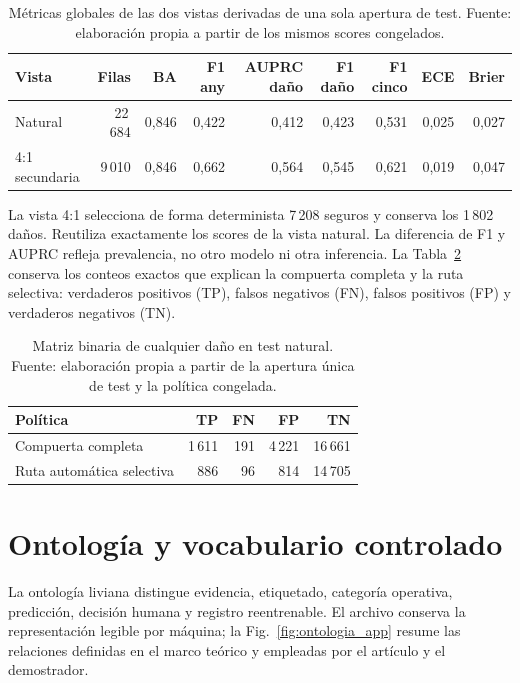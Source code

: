 \begin{table}[H]
\centering
\caption{Métricas globales de las dos vistas derivadas de una sola apertura de test. Fuente: elaboración propia a partir de los mismos scores congelados.}
\label{tab:test_views_app}
\small
\begin{tabular}{lrrrrrrrr}
\toprule
\textbf{Vista} & \textbf{Filas} & \textbf{BA} & \textbf{F1 any} & \textbf{AUPRC daño} & \textbf{F1 daño} & \textbf{F1 cinco} & \textbf{ECE} & \textbf{Brier} \\
\midrule
Natural & 22\,684 & 0,846 & 0,422 & 0,412 & 0,423 & 0,531 & 0,025 & 0,027 \\
4:1 secundaria & 9\,010 & 0,846 & 0,662 & 0,564 & 0,545 & 0,621 & 0,019 & 0,047 \\
\bottomrule
\end{tabular}
\end{table}

La vista 4:1 selecciona de forma determinista 7\,208 seguros y conserva los 1\,802 daños. Reutiliza exactamente los scores de la vista natural. La diferencia de F1 y AUPRC refleja prevalencia, no otro modelo ni otra inferencia. La Tabla~\ref{tab:confusion_app} conserva los conteos exactos que explican la compuerta completa y la ruta selectiva: verdaderos positivos (TP), falsos negativos (FN), falsos positivos (FP) y verdaderos negativos (TN).

\begin{table}[H]
\centering
\caption{Matriz binaria de cualquier daño en test natural. Fuente: elaboración propia a partir de la apertura única de test y la política congelada.}
\label{tab:confusion_app}
\small
\begin{tabular}{lrrrr}
\toprule
\textbf{Política} & \textbf{TP} & \textbf{FN} & \textbf{FP} & \textbf{TN} \\
\midrule
Compuerta completa & 1\,611 & 191 & 4\,221 & 16\,661 \\
Ruta automática selectiva & 886 & 96 & 814 & 14\,705 \\
\bottomrule
\end{tabular}
\end{table}

\clearpage
\section{Ontología y vocabulario controlado}
\label{app:ontologia}

La ontología liviana distingue evidencia, etiquetado, categoría operativa, predicción, decisión humana y registro reentrenable. El archivo  conserva la representación legible por máquina; la Fig.~\ref{fig:ontologia_app} resume las relaciones definidas en el marco teórico y empleadas por el artículo y el demostrador.

